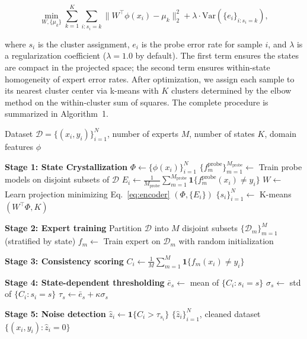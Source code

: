\begin{equation}
\min_{W, \{\mu_k\}} \sum_{k=1}^K \sum_{i: s_i = k} \bigl\| W^\top \phi(x_i) - \mu_k \bigr\|_2^2 + \lambda \cdot \mathrm{Var}(\{e_i\}_{i: s_i = k}),
\label{eq:encoder}
\end{equation}

where $s_i$ is the cluster assignment, $e_i$ is the probe error rate for sample $i$, and $\lambda$ is a regularization coefficient ($\lambda = 1.0$ by default). The first term ensures the states are compact in the projected space; the second term ensures within-state homogeneity of expert error rates. After optimization, we assign each sample to its nearest cluster center via k-means with $K$ clusters determined by the elbow method on the within-cluster sum of squares. The complete procedure is summarized in Algorithm~1.

\begin{algorithm}[t]
\caption{SCX: State-Conditioned eXpertise for Noise Detection}
\label{alg:scx}
\begin{algorithmic}[1]
\Require Dataset $\mathcal{D} = \{(x_i, y_i)\}_{i=1}^N$, number of experts $M$, number of states $K$, domain features $\phi$

\State \textbf{Stage 1: State Crystallization}
\State $\Phi \gets \{\phi(x_i)\}_{i=1}^N$ 
\State $\{f_m^{\text{probe}}\}_{m=1}^{M_{\text{probe}}} \gets$ Train probe models on disjoint subsets of $\mathcal{D}$
\State $E_i \gets \frac{1}{M_{\text{probe}}}\sum_{m=1}^{M_{\text{probe}}} \mathbf{1}\{f_m^{\text{probe}}(x_i) \neq y_i\}$ 
\State $W \gets$ Learn projection minimizing Eq.~\eqref{eq:encoder} $(\Phi, \{E_i\})$
\State $\{s_i\}_{i=1}^N \gets$ K-means$(W^\top \Phi, K)$ 

\State \textbf{Stage 2: Expert training}
\State Partition $\mathcal{D}$ into $M$ disjoint subsets $\{\mathcal{D}_m\}_{m=1}^M$ (stratified by state)
\State $f_m \gets$ Train expert on $\mathcal{D}_m$ with random initialization
\EndFor

\State \textbf{Stage 3: Consistency scoring}
\State $C_i \gets \frac{1}{M}\sum_{m=1}^M \mathbf{1}\{f_m(x_i) \neq y_i\}$ 
\EndFor

\State \textbf{Stage 4: State-dependent thresholding}
\State $\bar{e}_s \gets$ mean of $\{C_i : s_i = s\}$
\State $\sigma_s \gets$ std of $\{C_i : s_i = s\}$
\State $\tau_s \gets \bar{e}_s + \kappa \sigma_s$ 
\EndFor

\State \textbf{Stage 5: Noise detection}
\State $\hat{z}_i \gets \mathbf{1}\{C_i > \tau_{s_i}\}$ 
\State \Return $\{\hat{z}_i\}_{i=1}^N$, cleaned dataset $\{(x_i, y_i) : \hat{z}_i = 0\}$
\end{algorithmic}
\end{algorithm}

